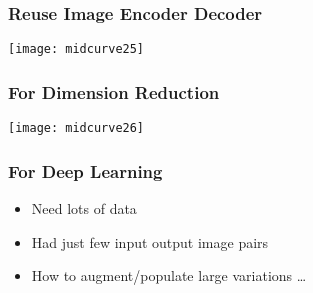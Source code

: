 \begin{frame}[fragile]\frametitle{Reuse Image Encoder Decoder}
\begin{center}
\texttt{[image: midcurve25]}
\end{center}	
\end{frame}

\begin{frame}[fragile]\frametitle{For Dimension Reduction}
\begin{center}
\texttt{[image: midcurve26]}
\end{center}	
\end{frame}

\begin{frame}[fragile]\frametitle{For Deep Learning}
	\begin{itemize}
	\item Need lots of data
	\item Had just few input output image pairs
	\item How to augment/populate large variations \ldots
	\end{itemize}
\end{frame}
